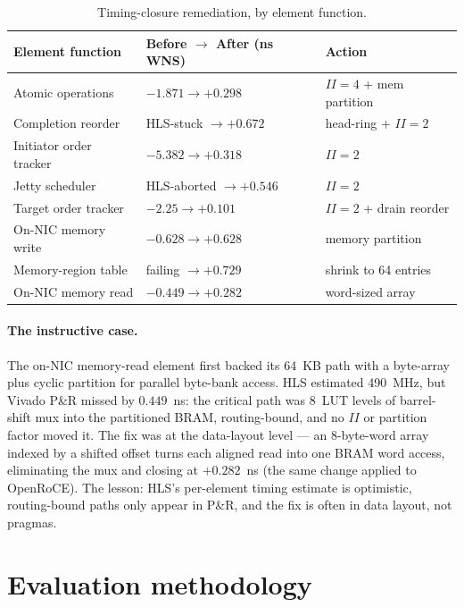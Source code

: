 \documentclass[10pt,twocolumn]{article}
\begin{document}
\begin{table}[h]
  \centering
  \scriptsize
  \setlength{\tabcolsep}{3pt}
  \begin{tabular}{@{}lll@{}}
  \toprule
  Element function & Before $\to$ After (ns WNS) & Action \\
  \midrule
  Atomic operations           & $-1.871 \to +0.298$ & $II{=}4$ + mem partition \\
  Completion reorder          & HLS-stuck $\to +0.672$ & head-ring + $II{=}2$ \\
  Initiator order tracker     & $-5.382 \to +0.318$ & $II{=}2$ \\
  Jetty scheduler             & HLS-aborted $\to +0.546$ & $II{=}2$ \\
  Target order tracker        & $-2.25 \to +0.101$ & $II{=}2$ + drain reorder \\
  On-NIC memory write         & $-0.628 \to +0.628$ & memory partition \\
  Memory-region table         & failing $\to +0.729$ & shrink to 64 entries \\
  On-NIC memory read          & $-0.449 \to +0.282$ & word-sized array \\
  \bottomrule
  \end{tabular}
  \caption{Timing-closure remediation, by element function.}
  \label{tab:timing-closure}
\end{table}

\paragraph{The instructive case.}
The on-NIC memory-read element first backed its 64~KB path with a
byte-array plus cyclic partition for parallel byte-bank access. HLS
estimated 490~MHz, but Vivado P\&R missed by $0.449$~ns: the
critical path was 8~LUT levels of barrel-shift mux into the
partitioned BRAM, routing-bound, and no $II$ or partition factor
moved it. The fix was at the data-layout level --- an
8-byte-word array indexed by a shifted offset turns each aligned
read into one BRAM word access, eliminating the mux and closing at
$+0.282$~ns (the same change applied to OpenRoCE). The lesson: HLS's
per-element timing estimate is optimistic, routing-bound paths only
appear in P\&R, and the fix is often in data layout, not pragmas.

\section{Evaluation methodology}
\label{sec:methodology}
\end{document}
